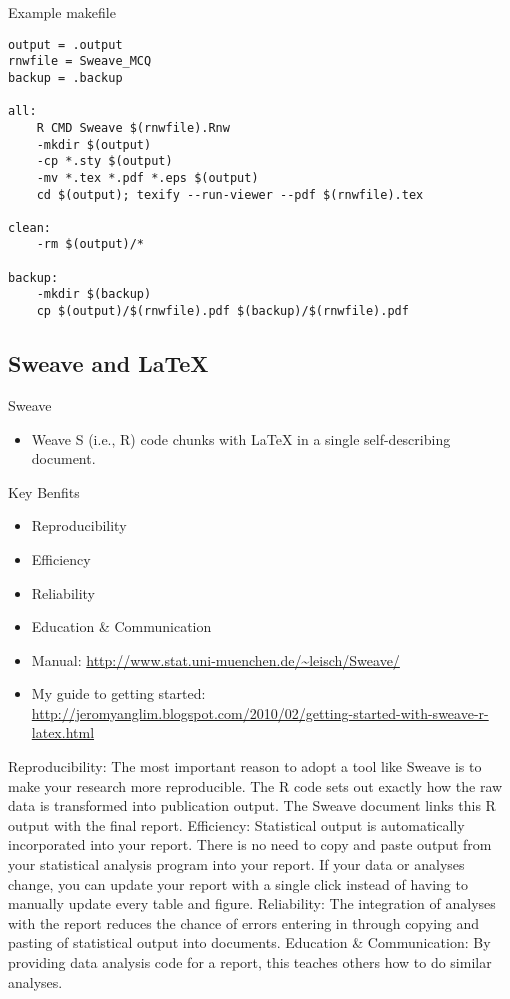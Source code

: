 \begin{frame}[containsverbatim, shrink=5]{Example makefile}
\begin{verbatim}
output = .output
rnwfile = Sweave_MCQ
backup = .backup

all:
    R CMD Sweave $(rnwfile).Rnw
    -mkdir $(output)
    -cp *.sty $(output)
    -mv *.tex *.pdf *.eps $(output)
    cd $(output); texify --run-viewer --pdf $(rnwfile).tex 

clean:
    -rm $(output)/*
	
backup:
    -mkdir $(backup)
    cp $(output)/$(rnwfile).pdf $(backup)/$(rnwfile).pdf 
\end{verbatim}

\end{frame}

\subsection{Sweave and LaTeX}
\begin{frame}{Sweave}

\begin{itemize}
\item Weave S (i.e., R) code chunks with LaTeX 
in a single self-describing document.
\end{itemize}

\begin{block}{Key Benfits}
\begin{itemize}
\item Reproducibility 
\item Efficiency
\item Reliability
\item Education \& Communication
\end{itemize}
\end{block}

{\tiny 
\begin{itemize}
\item Manual: \url{http://www.stat.uni-muenchen.de/~leisch/Sweave/}
\item My guide to getting started: \url{http://jeromyanglim.blogspot.com/2010/02/getting-started-with-sweave-r-latex.html}
\end{itemize}
}
\end{frame}

Reproducibility: The most important reason to adopt a tool like Sweave is to make your research more reproducible. The R code sets out exactly how the raw data is transformed into publication output. The Sweave document links this R output with the final report. 
Efficiency: Statistical output is automatically incorporated into your report. There is no need to copy and paste output from your statistical analysis program into your report. If your data or analyses change, you can update your report with a single click instead of having to manually update every table and figure.
Reliability: The integration of analyses with the report reduces the chance of errors entering in through copying and pasting of statistical output into documents.
Education \& Communication: By providing data analysis code for a report, this teaches others how to do similar analyses.



